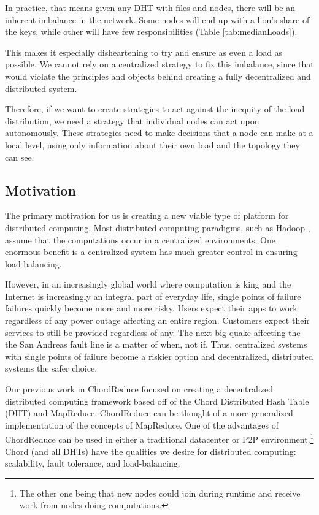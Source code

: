 \documentclass[11pt,letterpaper]{article}
\begin{document}
In practice, that means given any DHT with files and nodes, there will be an inherent imbalance in the network.
Some nodes will end up with a lion's share of the keys, while other will have few responsibilities (Table \ref{tab:medianLoads}).


This makes it especially disheartening to try and ensure as even a load as possible.
We cannot rely on a centralized strategy to fix this imbalance, since that would violate the principles and objects behind creating a fully decentralized and distributed system.

Therefore, if we want to create strategies to act against the inequity of the load distribution, we need a strategy that individual nodes can act upon autonomously.
These strategies need to make decisions that a node can make at a local level, using only information about their own load and the topology they can see.


\subsection*{Motivation}
The primary motivation for us is creating a new viable type of platform for distributed computing.
Most distributed computing paradigms, such as Hadoop \cite{hadoop}, assume that the computations occur in a centralized environments.
One enormous benefit is a centralized system has much greater control in ensuring load-balancing.

However, in an increasingly global world where computation is king and the Internet is increasingly an integral part of everyday life, single points of failure failures quickly become more and more risky.
Users expect their apps to work regardless of any power outage affecting an entire region.
Customers expect their services to still be provided regardless of any.
The next big quake affecting the the San Andreas fault line is a matter of when, not if.
Thus, centralized systems with single points of failure become a riskier option and decentralized, distributed systems the safer choice.


Our previous work in ChordReduce \cite{chordreduce} focused on creating a decentralized distributed computing framework based off of the Chord Distributed Hash Table (DHT) and MapReduce.
ChordReduce can be thought of a more generalized implementation of the concepts of MapReduce.
One of the advantages of ChordReduce can be used in either a traditional datacenter or P2P environment.\footnote{The other one being that new nodes could join during runtime and receive work from nodes doing computations.}
Chord (and all DHTs) have the qualities we desire for distributed computing: scalability, fault tolerance, and load-balancing.
\end{document}

